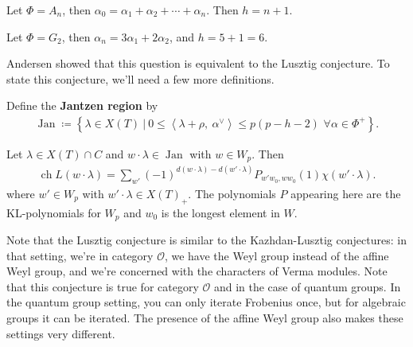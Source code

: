 \begin{example}[?]

Let \(\Phi = A_n\), then
\(\alpha_0 = \alpha_1 + \alpha_2 + \cdots + \alpha_n\). Then \(h=n+1\).

\end{example}

\begin{example}[?]

Let \(\Phi = G_2\), then \(\alpha_n = 3\alpha_1 + 2\alpha_2\), and
\(h = 5+1 = 6\).

\end{example}

\begin{remark}

Andersen showed that this question is equivalent to the Lusztig
conjecture. To state this conjecture, we'll need a few more definitions.

\end{remark}

\begin{definition}

Define the \textbf{Jantzen region} by
\begin{align*}  
\operatorname{Jan} \coloneqq\left\{{\lambda \in X(T) {~\mathrel{\Big|}~}
0 \leq {\left\langle {\lambda + \rho},~{\alpha^\vee} \right\rangle} \leq p(p-h-2) \,\, \forall \alpha\in \Phi^+
}\right\}
.\end{align*}

\end{definition}

\begin{proposition}

Let \(\lambda \in X(T) \cap C\) and
\(w\cdot\lambda \in \operatorname{Jan}\) with \(w\in W_p\). Then
\begin{align*}  
\operatorname{ch}L(w\cdot \lambda) = \sum_{w'} (-1)^{d(w\cdot \lambda) - d(w'\cdot \lambda)} P_{w'w_0, ww_0} (1) \chi(w'\cdot \lambda)
.\end{align*}
where \(w'\in W_p\) with \(w'\cdot\lambda \in X(T)_+\). The polynomials
\(P\) appearing here are the KL-polynomials for \(W_p\) and \(w_0\) is
the longest element in \(W\).

\end{proposition}

\begin{remark}

Note that the Lusztig conjecture is similar to the Kazhdan-Lusztig
conjectures: in that setting, we're in category \({\mathcal{O}}\), we
have the Weyl group instead of the affine Weyl group, and we're
concerned with the characters of Verma modules. Note that this
conjecture is true for category \({\mathcal{O}}\) and in the case of
quantum groups. In the quantum group setting, you can only iterate
Frobenius once, but for algebraic groups it can be iterated. The
presence of the affine Weyl group also makes these settings very
different.

\end{remark}

